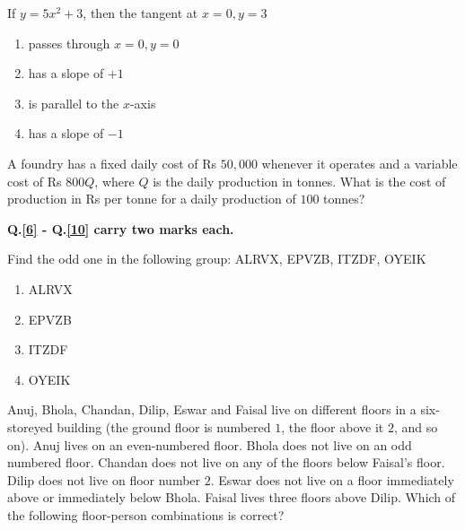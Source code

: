    \item If $y = 5x^2 +3$, then the tangent at $x=0, y=3$
        \begin{enumerate}
            \item passes through $x=0, y=0$
            \item has a slope of $+1$
            \item is parallel to the $x$-axis
            \item has a slope of $-1$
        \end{enumerate}

    \item A foundry has a fixed daily cost of Rs $50,000$ whenever it operates and a variable cost of Rs $800Q$, where $Q$ is the daily production in tonnes. What is the cost of production in Rs per tonne for a daily production of $100$ tonnes?
    
    \item[] \textbf{Q.\ref{6} - Q.\ref{10} carry two marks each.}

    \item \label{6} Find the odd one in the following group: ALRVX, EPVZB, ITZDF, OYEIK
        \begin{enumerate}
            \item ALRVX
            \item EPVZB
            \item ITZDF
            \item OYEIK
        \end{enumerate}

    \item Anuj, Bhola, Chandan, Dilip, Eswar and Faisal live on different floors in a six-storeyed building (the ground floor is numbered $1$, the floor above it $2$, and so on). Anuj lives on an even-numbered floor. Bhola does not live on an odd numbered floor. Chandan does not live on any of the floors below Faisal's floor. Dilip does not live on floor number $2$. Eswar does not live on a floor immediately above or immediately below Bhola. Faisal lives three floors above Dilip. Which of the following floor-person combinations is correct?
    
        \begin{table}[h!]    
            \centering
            
            \caption{}
            \label{7}
        \end{table}

